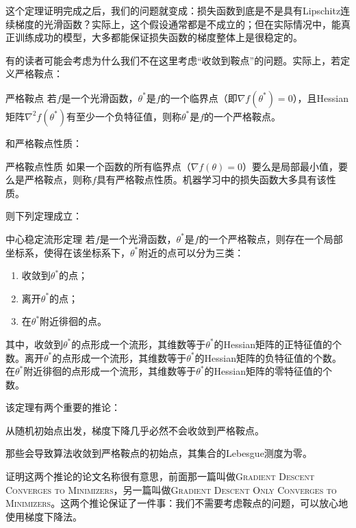 这个定理证明完成之后，我们的问题就变成：损失函数到底是不是具有Lipschitz连续梯度的光滑函数？实际上，这个假设通常都是不成立的；但在实际情况中，能真正训练成功的模型，大多都能保证损失函数的梯度整体上是很稳定的。\cite{kexuefm-6992}

有的读者可能会考虑为什么我们不在这里考虑“收敛到鞍点”的问题。实际上，若定义严格鞍点：
\begin{definition}{严格鞍点}{}
    若$f$是一个光滑函数，$\theta^*$是$f$的一个临界点（即$\nabla f(\theta^*) = 0$），且Hessian矩阵$\nabla^2 f(\theta^*)$有至少一个负特征值，则称$\theta^*$是$f$的一个严格鞍点。
\end{definition}
和严格鞍点性质：
\begin{definition}{严格鞍点性质}{}
    如果一个函数的所有临界点（$\nabla f(\theta) = 0$）要么是局部最小值，要么是严格鞍点，则称$f$具有严格鞍点性质。机器学习中的损失函数大多具有该性质。
\end{definition}

则下列定理成立：
\begin{theorem}{中心稳定流形定理}{}
    若$f$是一个光滑函数，$\theta^*$是$f$的一个严格鞍点，则存在一个局部坐标系，使得在该坐标系下，$\theta^*$附近的点可以分为三类：
    \begin{enumerate}
        \item 收敛到$\theta^*$的点；
        \item 离开$\theta^*$的点；
        \item 在$\theta^*$附近徘徊的点。
    \end{enumerate}
    其中，收敛到$\theta^*$的点形成一个流形，其维数等于$\theta^*$的Hessian矩阵的正特征值的个数。离开$\theta^*$的点形成一个流形，其维数等于$\theta^*$的Hessian矩阵的负特征值的个数。在$\theta^*$附近徘徊的点形成一个流形，其维数等于$\theta^*$的Hessian矩阵的零特征值的个数。
\end{theorem}

该定理有两个重要的推论：
\begin{corollary}{}{}
    从随机初始点出发，梯度下降几乎必然不会收敛到严格鞍点\cite{lee2016gradientdescentconvergesminimizers}。
\end{corollary}{}{}

\begin{corollary}{}{}
    那些会导致算法收敛到严格鞍点的初始点，其集合的Lebesgue测度为零\cite{panageas2016gradientdescentconvergesminimizers}。
\end{corollary}{}{}
证明这两个推论的论文名称很有意思，前面那一篇叫做\textsc{Gradient Descent Converges to Minimizers}，另一篇叫做\textsc{Gradient Descent Only Converges to Minimizers}。这两个推论保证了一件事：我们不需要考虑鞍点的问题，可以放心地使用梯度下降法。

